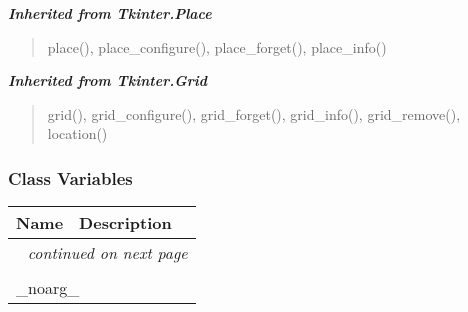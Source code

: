 \large{\textbf{\textit{Inherited from Tkinter.Place}}}

\begin{quote}
place(), place\_configure(), place\_forget(), place\_info()
\end{quote}

\large{\textbf{\textit{Inherited from Tkinter.Grid}}}

\begin{quote}
grid(), grid\_configure(), grid\_forget(), grid\_info(), grid\_remove(), location()
\end{quote}


  \subsubsection{Class Variables}

    \vspace{-1cm}
\hspace{\varindent}\begin{longtable}{|p{\varnamewidth}|p{\vardescrwidth}|l}
\cline{1-2}
\cline{1-2} \centering \textbf{Name} & \centering \textbf{Description}& \\
\cline{1-2}
\endhead\cline{1-2}\multicolumn{3}{r}{\small\textit{continued on next page}}\\\endfoot\cline{1-2}
\endlastfoot\multicolumn{2}{|l|}{\textit{Inherited from Tkinter.Misc}}\\
\multicolumn{2}{|p{\varwidth}|}{\raggedright \_noarg\_}\\
\cline{1-2}
\end{longtable}

